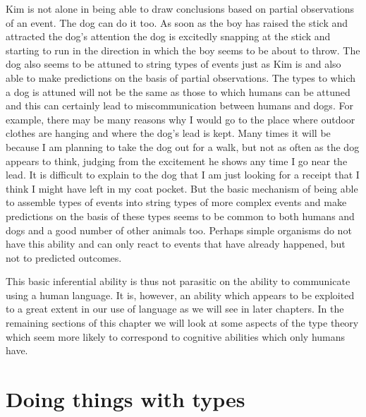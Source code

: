 Kim is not alone in being able to draw conclusions based on partial
observations of an event.  The dog can do it too.  As soon as the boy
has raised the stick and attracted the dog's attention the dog is
excitedly snapping at the stick and starting to run in the direction
in which the boy seems to be about to throw.  The dog also seems to be
attuned to string types of events just as Kim is and also able to make
predictions on the basis of partial observations.  The types to which
a dog is attuned will not be the same as those to which humans can be
attuned and this can certainly lead to miscommunication between humans
and dogs.  For example, there may be many reasons why I would go to
the place where outdoor clothes are hanging and where the dog's lead
is kept.  Many times it will be because I am planning to take the dog
out for a walk, but not as often as the dog appears to think, judging
from the excitement he shows any time I go near the lead.  It is
difficult to explain to the dog that I am just looking for a receipt
that I think I might have left in my coat pocket.  But the basic
mechanism of being able to assemble types of events
into string types of more complex events and make predictions on the
basis of these types seems to be common to both humans and dogs and a
good number of other animals too.  Perhaps simple organisms do not
have this ability and can only react to events that have already
happened, but not to predicted outcomes.

This basic inferential ability is thus not parasitic on the ability to
communicate using a human language.  It is, however, an ability which
appears to be exploited to a great extent in our use of language as we
will see in later chapters.  In the remaining sections of this chapter
we will look at some aspects of the type theory which seem more likely
to
correspond to cognitive abilities which only humans have.



\section{Doing things with types}
\label{sec:typeacts}

